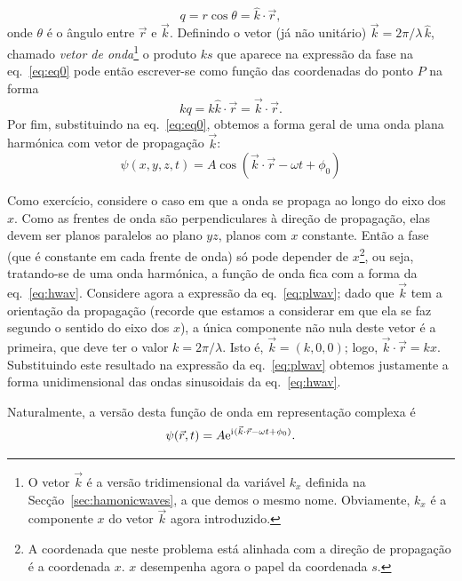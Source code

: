 \begin{equation*}
  q = r\cos\theta = \hat k\cdot\vec r,
\end{equation*}
onde $\theta$ é o ângulo entre $\vec r$ e $\vec k$.  Definindo o vetor (já não
unitário) $\vec k=2\pi/\lambda\,\hat k$, chamado \emph{vetor de
onda}\footnote{O vetor $\vec k$ é a versão tridimensional da
variável $k_x$ definida na Secção~\ref{sec:hamonicwaves}, a que demos o mesmo
nome. Obviamente, $k_x$ é a componente $x$ do vetor $\vec k$ agora introduzido.}
o produto $ks$ que aparece na expressão da fase na eq.~\eqref{eq:eq0} pode então
escrever-se como função das coordenadas do ponto $P$ na forma
\begin{equation*}
  kq=k\hat k\cdot \vec r=\vec k\cdot\vec r.
\end{equation*}
Por fim, substituindo na eq.~\eqref{eq:eq0}, obtemos a forma geral de uma onda
plana harmónica com vetor de propagação $\vec k$:
\begin{equation} \label{eq:plwav}
\psi(x,y,z,t)=A\cos(\vec k\cdot\vec r-\omega t+\phi_0)
\end{equation}

Como exercício, considere o caso em que a onda se propaga ao longo do eixo dos
$x$. Como as frentes de onda são perpendiculares à direção de propagação, elas
devem ser planos paralelos ao plano $yz$, planos com $x$ constante. Então a fase
(que é constante em cada frente de onda) só pode depender de $x$\footnote{A
  coordenada que neste problema está alinhada com a direção de propagação é a
coordenada $x$. $x$ desempenha agora o papel da coordenada $s$.}, ou seja,
tratando-se de uma onda harmónica, a função de onda fica com a forma da
eq.~\eqref{eq:hwav}. Considere agora a expressão da eq.~\eqref{eq:plwav}; dado
que $\vec k$ tem a orientação da propagação (recorde que estamos a considerar em
que ela se faz segundo o sentido do eixo dos $x$), a única componente não nula
deste vetor é a primeira, que deve ter o valor $k=2\pi/\lambda$. Isto é, $\vec
k=(k,0,0)$; logo, $\vec k\cdot\vec r=kx$.  Substituindo este resultado na
expressão da eq.~\eqref{eq:plwav} obtemos justamente a forma unidimensional das
ondas sinusoidais da eq.~\eqref{eq:hwav}.

Naturalmente, a versão desta função de onda em representação complexa é
\begin{equation}\label{eq:phwfexp}
  \psi(\vec r,t)=A\e^{\iu(\vec k\cdot \vec r-\omega t+\phi_0)}.
\end{equation}

